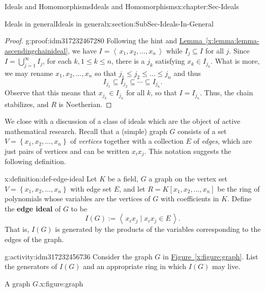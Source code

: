 \documentclass[oneside,10pt,]{book}
\newcommand{\xreffont}{\relax}
\newcommand{\terminology}[1]{\textbf{#1}}
\numberwithin{equation}{section}
\renewcommand{\le}{\leqslant}
\newcommand{\ideal}[1]{\left\langle\, #1 \,\right\rangle}
\newcommand{\set}[1]{\left\{ {#1} \right\}}
\begin{document}
\begin{chapterptx}{Ideals and Homomorphisms}{}{Ideals and Homomorphisms}{}{}{x:chapter:Sec-Ideals}
\begin{sectionptx}{Ideals in general}{}{Ideals in general}{}{}{x:section:SubSec-Ideals-In-General}
\begin{proof}{}{g:proof:idm317232467280}
Following the hint and \hyperref[x:lemma:lemma-ascendingchainideal]{Lemma~{\xreffont\ref{x:lemma:lemma-ascendingchainideal}}}, we have \(I = \ideal{x_1, x_2, \ldots, x_n}\) while \(I_j\subseteq I\) for all \(j\). Since \(I = \bigcup\limits_{j=1}^\infty I_j\), for each \(k, 1\le k \le n\), there is a \(j_k\) satisfying \(x_k \in I_{j_k}\). What is more, we may rename \(x_1, x_2, \ldots, x_n\) so that \(j_1 \le j_2 \le \ldots \le j_n\) and thus%
\begin{equation*}
I_{j_1} \subseteq I_{j_2}\subseteq \cdots \subseteq I_{j_n}.
\end{equation*}
Observe that this means that \(x_{j_k}\in I_{j_n}\) for all \(k\), so that \(I = I_{j_n}\). Thus, the chain stabilizes, and \(R\) is Noetherian.%
\end{proof}
We close with a discussion of a class of ideals which are the object of active mathematical research. Recall that a (simple) graph \(G\) consists of a set \(V = \set{x_1, x_2, \ldots, x_n}\) of \emph{vertices} together with a collection \(E\) of \emph{edges}, which are just pairs of vertices and can be written \(x_i x_j\). This notation suggests the following definition.%
\begin{definition}{}{x:definition:def-edge-ideal}%
Let \(K\) be a field, \(G\) a graph on the vertex set \(V = \set{x_1, x_2, \ldots, x_n}\) with edge set \(E\), and let \(R = K[x_1, x_2, \ldots, x_n]\) be the ring of polynomials whose variables are the vertices of \(G\) with coefficients in \(K\). Define the \terminology{edge ideal} of \(G\) to be%
\begin{equation*}
I(G) := \ideal{x_i x_j \mid x_i x_j\in E}.
\end{equation*}
That is, \(I(G)\) is generated by the products of the variables corresponding to the edges of the graph.%
\end{definition}
\begin{activity}{}{g:activity:idm317232456736}%
Consider the graph \(G\) in \hyperref[x:figure:graph]{Figure~{\xreffont\ref{x:figure:graph}}}. List the generators of \(I(G)\) and an appropriate ring in which \(I(G)\) may live.%
\end{activity}
\begin{figureptx}{A graph \(G\).}{x:figure:graph}{}%
\begin{image}{0.25}{0.5}{0.25}%

\end{image}
\end{figureptx}
\end{sectionptx}
\end{chapterptx}
\end{document}
